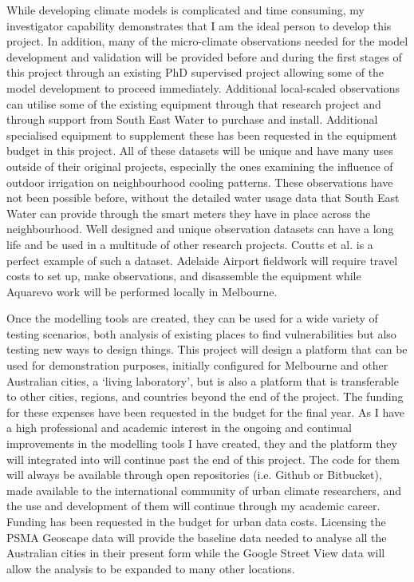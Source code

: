 While developing climate models is complicated and time consuming, my investigator capability demonstrates that I am the ideal person to develop this project. In addition, many of the micro-climate observations needed for the model development and validation will be provided before and during the first stages of this project through an existing PhD supervised project allowing some of the model development to proceed immediately. Additional local-scaled observations can utilise some of the existing equipment through that research project and through support from South East Water to purchase and install. Additional specialised equipment to supplement these has been requested in the equipment budget in this project. All of these datasets will be unique and have many uses outside of their original projects, especially the ones examining the influence of outdoor irrigation on neighbourhood cooling patterns. These observations have not been possible before, without the detailed water usage data that South East Water can provide through the smart meters they have in place across the neighbourhood. Well designed and unique observation datasets can have a long life and be used in a multitude of other research projects. Coutts et al.\cite{Coutts2007} is a perfect example of such a dataset. Adelaide Airport fieldwork will require travel costs to set up, make observations, and disassemble the equipment while Aquarevo work will be performed locally in Melbourne.

Once the modelling tools are created, they can be used for a wide variety of testing scenarios, both analysis of existing places to find vulnerabilities but also testing new ways to design things. This project will design a platform that can be used for demonstration purposes, initially configured for Melbourne and other Australian cities, a `living laboratory', but is also a platform that is transferable to other cities, regions, and countries beyond the end of the project. The funding for these expenses have been requested in the budget for the final year. As I have a high professional and academic interest in the ongoing and continual improvements in the modelling tools I have created, they and the platform they will integrated into will continue past the end of this project. The code for them will always be available through open repositories (i.e. Github or Bitbucket), made available to the international community of urban climate researchers, and the use and development of them will continue through my academic career. Funding has been requested in the budget for urban data costs. Licensing the PSMA Geoscape data will provide the baseline data needed to analyse all the Australian cities in their present form while the Google Street View data will allow the analysis to be expanded to many other locations.


